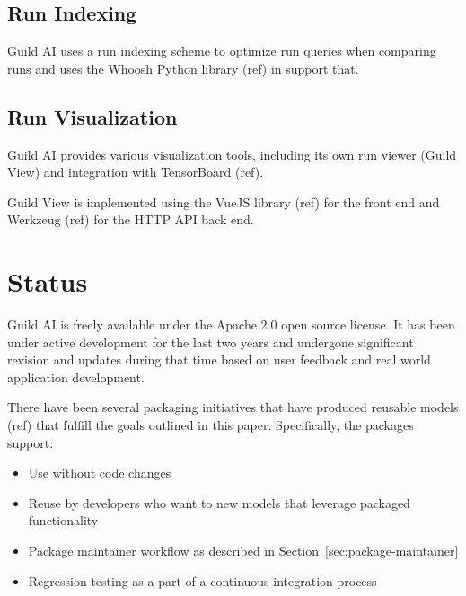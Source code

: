 \documentclass{article}
\begin{document}
\subsection{Run Indexing}

Guild AI uses a run indexing scheme to optimize run queries when
comparing runs and uses the Whoosh Python library (ref) in support
that.

\subsection{Run Visualization}

Guild AI provides various visualization tools, including its own run
viewer (Guild View) and integration with TensorBoard (ref).

Guild View is implemented using the VueJS library (ref) for the front
end and Werkzeug (ref) for the HTTP API back end.
\fi

\section{Status}

Guild AI is freely available under the Apache 2.0 open source
license. It has been under active development for the last two years
and undergone significant revision and updates during that time based
on user feedback and real world application development.

There have been several packaging initiatives that have produced
reusable models (ref) that fulfill the goals outlined in this
paper. Specifically, the packages support:

\begin{itemize}
\item Use without code changes
\item Reuse by developers who want to new models that leverage
  packaged functionality
\item Package maintainer workflow as described in
  Section~\ref{sec:package-maintainer}
\item Regression testing as a part of a continuous integration process
\end{itemize}



\end{document}
